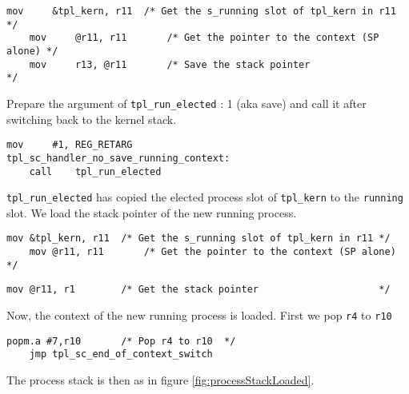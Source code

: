 \documentclass[11pt, oneside]{article}   	%
\begin{document}
\begin{lstlisting}[backgroundcolor=\color{red!15}]
    mov     &tpl_kern, r11  /* Get the s_running slot of tpl_kern in r11 */
    mov     @r11, r11       /* Get the pointer to the context (SP alone) */
    mov     r13, @r11       /* Save the stack pointer                    */
\end{lstlisting}

Prepare the argument of \lstinline{tpl_run_elected} : 1 (aka save) and call it after switching back to the kernel stack.

\begin{lstlisting}[backgroundcolor=\color{red!15}]
    mov     #1, REG_RETARG
tpl_sc_handler_no_save_running_context:
    call    tpl_run_elected
\end{lstlisting}

\lstinline{tpl_run_elected} has copied the elected process slot of \lstinline{tpl_kern} to the \lstinline{running} slot. We load the stack pointer of the new running process.

\begin{lstlisting}[backgroundcolor=\color{red!15}]
    mov &tpl_kern, r11  /* Get the s_running slot of tpl_kern in r11 */
    mov @r11, r11       /* Get the pointer to the context (SP alone) */
\end{lstlisting}
\begin{lstlisting}[backgroundcolor=\color{yellow!15}]
    mov @r11, r1        /* Get the stack pointer                     */
\end{lstlisting}

Now, the context of the new running process is loaded. First we pop \lstinline{r4} to \lstinline{r10}

\begin{lstlisting}[backgroundcolor=\color{yellow!15}]
    popm.a #7,r10       /* Pop r4 to r10  */
	jmp tpl_sc_end_of_context_switch
\end{lstlisting}

The process stack is then as in figure \ref{fig:processStackLoaded}.
\end{document}
